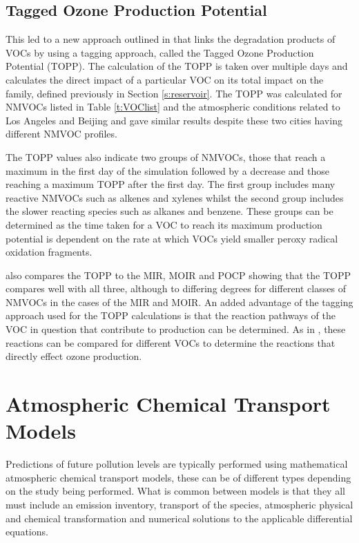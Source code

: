 \subsection{Tagged Ozone Production Potential} \label{s:TOPP}
This led to a new approach outlined in \citep{Butler:2011} that links the degradation products of VOCs by using a tagging 
approach, called the Tagged Ozone Production Potential (TOPP). The calculation of the TOPP is taken over multiple days and 
calculates the direct impact of a particular VOC on its total impact on the  family, defined previously in Section
\ref{s:reservoir}. The TOPP was calculated for NMVOCs listed in Table \ref{t:VOClist} and the atmospheric conditions related to
Los Angeles and Beijing and gave similar results despite these two cities having different NMVOC profiles. 

The TOPP values also indicate two groups of NMVOCs, those that reach a maximum in the first day of the simulation followed by a
decrease and those reaching a maximum TOPP after the first day. The first group includes many reactive NMVOCs such as alkenes 
and xylenes whilst the second group includes the slower reacting species such as alkanes and benzene. These groups can be 
determined as the time taken for a VOC to reach its maximum  production potential is dependent on the rate at which VOCs
yield smaller peroxy radical oxidation fragments. 

\citep{Butler:2011} also compares the TOPP to the MIR, MOIR and POCP showing that the TOPP compares well with all three, 
although to differing degrees for different classes of NMVOCs in the cases of the MIR and MOIR. An added advantage of the 
tagging approach used for the TOPP calculations is that the reaction pathways of the VOC in question that contribute to 
production can be determined. As in \citep{Butler:2011}, these reactions can be compared for different VOCs to determine the 
reactions that directly effect ozone production.

\section{Atmospheric Chemical Transport Models}
Predictions of future  pollution levels are typically performed using mathematical atmospheric chemical transport 
models, these can be of different types depending on the study being performed. What is common between models is that they all 
must include an emission inventory, transport of the species, atmospheric physical and chemical transformation and numerical 
solutions to the applicable differential equations. 

